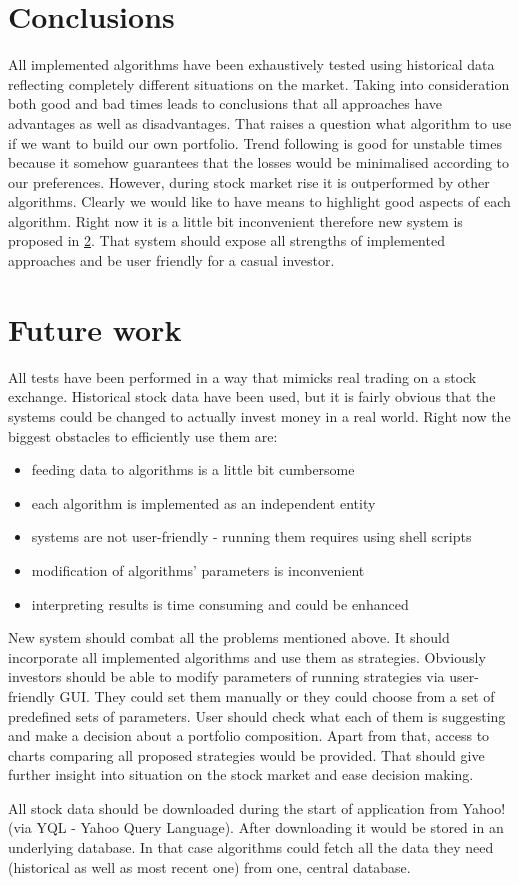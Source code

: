 \section{Conclusions}

All implemented algorithms have been exhaustively tested using historical data reflecting completely different situations on the market.
Taking into consideration both good and bad times leads to conclusions that all approaches have advantages as well as disadvantages.
That raises a question what algorithm to use if we want to build our own portfolio.
Trend following is good for unstable times because it somehow guarantees that the losses would be minimalised according to our preferences.
However, during stock market rise it is outperformed by other algorithms.
Clearly we would like to have means to highlight good aspects of each algorithm.  
Right now it is a little bit inconvenient therefore new system is proposed in \ref{sec:future}.
That system should expose all strengths of implemented approaches and be user friendly for a casual investor. 


\section{Future work}
\label{sec:future}

All tests have been performed in a way that mimicks real trading on a stock exchange.
Historical stock data have been used, but it is fairly obvious that the systems could be changed to actually invest money in a real world.
Right now the biggest obstacles to efficiently use them are:

\begin{itemize}
  \item feeding data to algorithms is a little bit cumbersome
  \item each algorithm is implemented as an independent entity
  \item systems are not user-friendly - running them requires using shell scripts
  \item modification of algorithms' parameters is inconvenient
  \item interpreting results is time consuming and could be enhanced
\end{itemize}
 
New system should combat all the problems mentioned above.
It should incorporate all implemented algorithms and use them as strategies.
Obviously investors should be able to modify parameters of running strategies via user-friendly GUI.
They could set them manually or they could choose from a set of predefined sets of parameters.
User should check what each of them is suggesting and make a decision about a portfolio composition.
Apart from that, access to charts comparing all proposed strategies would be provided.
That should give further insight into situation on the stock market and ease decision making.

All stock data should be downloaded during the start of application from Yahoo! (via YQL - Yahoo Query Language).
After downloading it would be stored in an underlying database.
In that case algorithms could fetch all the data they need (historical as well as most recent one) from one, central database.
 

